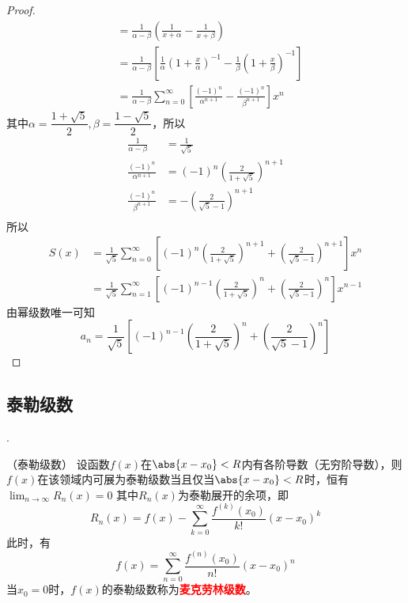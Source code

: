 \begin{proof}
\begin{align*}
         & = \frac{1}{\alpha-\beta}\left(\frac{1}{x+\alpha} - \frac{1}{x+\beta}\right)                                                                        \\
         & = \frac{1}{\alpha-\beta}\left[\frac{1}{\alpha}\left(1 + \frac{x}{\alpha}\right)^{-1} - \frac{1}{\beta}\left(1 + \frac{x}{\beta}\right)^{-1}\right] \\
         & = \frac{1}{\alpha-\beta} \sum_{n=0}^\infty\left[\frac{(-1)^n}{\alpha^{n+1}} - \frac{(-1)^n}{\beta^{n+1}}\right]x^n
    \end{align*}
    其中$\alpha = \dfrac{1+\sqrt{5}}{2},\beta = \dfrac{1-\sqrt{5}}{2}$，所以
    \begin{align*}
        \frac{1}{\alpha-\beta}      & = \frac{1}{\sqrt{5}}                            \\
        \frac{(-1)^n}{\alpha^{n+1}} & = (-1)^n\left(\frac{2}{1+\sqrt{5}}\right)^{n+1} \\
        \frac{(-1)^n}{\beta^{n+1}}  & = -\left(\frac{2}{\sqrt{5}-1}\right)^{n+1}      \\
    \end{align*}
    所以
    \begin{align*}
        S(x)
         & = \frac{1}{\sqrt{5}}\sum_{n=0}^\infty\left[(-1)^n\left(\frac{2}{1+\sqrt{5}}\right)^{n+1} + \left(\frac{2}{\sqrt{5}-1}\right)^{n+1} \right]x^n \\
         & = \frac{1}{\sqrt{5}}\sum_{n=1}^\infty\left[(-1)^{n-1}\left(\frac{2}{1+\sqrt{5}}\right)^n + \left(\frac{2}{\sqrt{5}-1}\right)^n \right]x^{n-1}
    \end{align*}
    由幂级数唯一可知
    \[ a_n = \frac{1}{\sqrt{5}} \left[(-1)^{n-1}\left(\frac{2}{1+\sqrt{5}}\right)^n + \left(\frac{2}{\sqrt{5}-1}\right)^n \right] \]
\end{proof}

\subsection{泰勒级数}
.
\begin{theorem}
    （泰勒级数）
    \label{th:泰勒级数}
    设函数$f(x)$在$\abs{x-x_0}<R$内有各阶导数（无穷阶导数），则$f(x)$在该领域内可展为泰勒级数当且仅当$\abs{x-x_0}<R$时，恒有$\displaystyle\lim_{n\to\infty}R_n(x)=0$
    其中$R_n(x)$为泰勒展开的余项，即
    \[ R_n(x) = f(x) - \sum_{k=0}^{\infty}\frac{f^{(k)}(x_0)}{k!}(x-x_0)^k \]
    此时，有
    \[ f(x) = \sum_{n=0}^\infty \frac{f^{(n)}(x_0)}{n!}(x-x_0)^n \]
    当$x_0=0$时，$f(x)$的泰勒级数称为\textcolor{red}{\textbf{\textsf{麦克劳林级数}}}。
\end{theorem}

